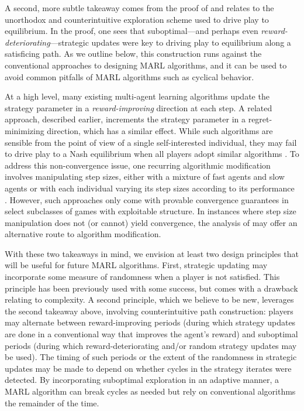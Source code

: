 A second, more subtle takeaway comes from the proof of  and relates to the unorthodox and counterintuitive exploration scheme used to drive play to equilibrium. In the proof, one sees that suboptimal---and perhaps even \emph{reward-deteriorating}---strategic updates were key to driving play to equilibrium along a satisficing path. As we outline below, this construction runs against the conventional approaches to designing MARL algorithms, and it can be used to avoid common pitfalls of MARL algorithms such as cyclical behavior. 

At a high level, many existing multi-agent learning algorithms update the strategy parameter in a \emph{reward-improving} direction at each step. A related approach, described earlier, increments the strategy parameter in a regret-minimizing direction, which has a similar effect. While such algorithms are sensible from the point of view of a single self-interested individual, they may fail to drive play to a Nash equilibrium when all players adopt similar algorithms \cite{mazumdar2020gradient, flokas2019poincare, mertikopoulos2018cycles}. To address this non-convergence issue, one recurring algorithmic modification involves manipulating step sizes, either with a mixture of fast agents and slow agents \cite{daskalakis2020independent} or with each individual varying its step sizes according to its performance \cite{bowling2002multiagent}. However, such approaches only come with provable convergence guarantees in select subclasses of games with exploitable structure. In instances where step size manipulation does not (or cannot) yield convergence, the analysis of  may offer an alternative route to algorithm modification. 


With these two takeaways in mind, we envision at least two design principles that will be useful for future MARL algorithms. First, strategic updating may incorporate some measure of randomness when a player is not satisfied. This principle has been previously used with some success, but comes with a drawback relating to complexity. A second principle, which we believe to be new, leverages the second takeaway above, involving counterintuitive path construction: players may alternate between reward-improving periods (during which strategy updates are done in a conventional way that improves the agent's reward) and suboptimal periods (during which reward-deteriorating and/or random strategy updates may be used). The timing of such periods or the extent of the randomness in strategic updates may be made to depend on whether cycles in the strategy iterates were detected. By incorporating suboptimal exploration in an adaptive manner, a MARL algorithm can break cycles as needed but rely on conventional algorithms the remainder of the time. 
